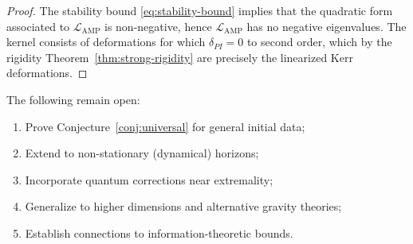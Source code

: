 \begin{proof}
The stability bound \eqref{eq:stability-bound} implies that the quadratic form associated to $\mathcal{L}_{\mathrm{AMP}}$ is non-negative, hence $\mathcal{L}_{\mathrm{AMP}}$ has no negative eigenvalues. The kernel consists of deformations for which $\delta_{PI} = 0$ to second order, which by the rigidity Theorem~\ref{thm:strong-rigidity} are precisely the linearized Kerr deformations.
\end{proof}

\begin{remark}
The following remain open:
\begin{enumerate}
    \item Prove Conjecture~\ref{conj:universal} for general initial data;
    \item Extend to non-stationary (dynamical) horizons;
    \item Incorporate quantum corrections near extremality;
    \item Generalize to higher dimensions and alternative gravity theories;
    \item Establish connections to information-theoretic bounds.
\end{enumerate}
\end{remark}

